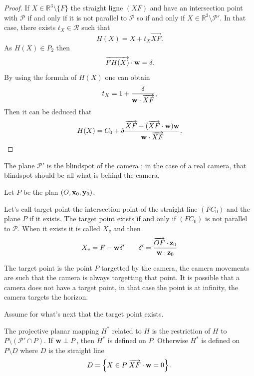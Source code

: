 \begin{proof}
If $X\in \mathbb{R}^3 \setminus \{F\}$ the straight ligne $(XF)$ and have an intersection point with $\mathcal{P}$ if and only if it is not parallel to  $\mathcal{P}$ so if and only if $X\in \mathbb{R}^3 \setminus \mathcal{P}'$. In that case, there exists $t_X\in \mathcal{R}$ such that
\begin{equation*}
H(X)=X+t_{X}\overrightarrow{XF}.
\end{equation*}
As $H(X)\in P_{2}$ then
\begin{equation*}
\overrightarrow{FH(X)}\cdot \mathbf{w} =\delta.
\end{equation*}
By using the formula of $H(X)$ one can obtain
\begin{equation*}
t_{X}=1+\frac{\delta}{\mathbf{w} \cdot \overrightarrow{XF}},
\end{equation*}
 Then it can be deduced that
\begin{equation*}
H(X) = C_0 +  \delta \frac{\overrightarrow{XF}-(\overrightarrow{XF}\cdot \mathbf{w} )\mathbf{w}}{\mathbf{w} \cdot \overrightarrow{XF}}.
\end{equation*}
\end{proof}
\begin{remarque}
The plane $\mathcal{P}'$ is the blindspot of the camera ; in the case of a real camera, that blindspot should be all what is behind the camera.
\end{remarque}
Let $P$ be the plan $(O,\mathbf{x}_0,\mathbf{y}_0)$.
\begin{Def} Let's call target point the intersection point of the straight line $(FC_0)$ and the plane $P$ if it exists. The target point exists if and only if $(FC_0)$ is not parallel to $\mathcal{P}$. When it exists it is called $X_v$ and then
\begin{equation*}
X_v=F-\mathbf{w} \delta'~~~~~~\delta'=\frac{\overrightarrow{OF}\cdot \mathbf{z}_0}{\mathbf{w} \cdot \mathbf{z}_0}
\label{formule_point_vise}
\end{equation*}
\label{point_vise}
\end{Def}
\begin{remarque}
The target point is the point $P$ targetted by the camera, the camera movements are such that the camera is always targetting that point. It is possible that a camera does not have a target point, in that case the point is at infinity, the camera targets the horizon.
\end{remarque}
Assume for what's next that the target point exists.
\begin{Def}
The projective planar mapping $H^*$ related to $H$ is the restriction of $H$ to $P\setminus (\mathcal{P}'\cap P)$. 
If $\mathbf{w} \perp P $, then $H^*$ is defined on $P$. Otherwise $H^*$ is defined on $P\setminus D$ where $D$ is the straight line
\begin{equation*}
D=\left\{ X\in P | \overrightarrow{XF}\cdot \mathbf{w} = 0\right\}.
\end{equation*}
\end{Def}
